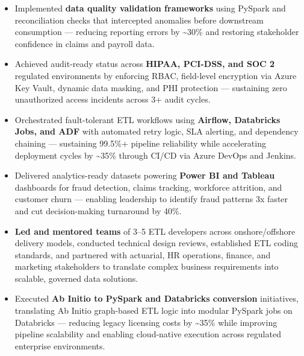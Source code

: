 \documentclass[a4paper,10pt]{article}
\begin{document}
\begin{itemize}
    \item Implemented \textbf{data quality validation frameworks} using PySpark and reconciliation checks that intercepted anomalies before downstream consumption — reducing reporting errors by \textasciitilde 30\% and restoring stakeholder confidence in claims and payroll data.
    \item Achieved audit-ready status across \textbf{HIPAA, PCI-DSS, and SOC 2} regulated environments by enforcing RBAC, field-level encryption via Azure Key Vault, dynamic data masking, and PHI protection — sustaining zero unauthorized access incidents across 3+ audit cycles.
    \item Orchestrated fault-tolerant ETL workflows using \textbf{Airflow, Databricks Jobs, and ADF} with automated retry logic, SLA alerting, and dependency chaining — sustaining 99.5\%+ pipeline reliability while accelerating deployment cycles by \textasciitilde 35\% through CI/CD via Azure DevOps and Jenkins.
    \item Delivered analytics-ready datasets powering \textbf{Power BI and Tableau} dashboards for fraud detection, claims tracking, workforce attrition, and customer churn — enabling leadership to identify fraud patterns 3x faster and cut decision-making turnaround by 40\%.
    \item \textbf{Led and mentored teams} of 3--5 ETL developers across onshore/offshore delivery models, conducted technical design reviews, established ETL coding standards, and partnered with actuarial, HR operations, finance, and marketing stakeholders to translate complex business requirements into scalable, governed data solutions.
    \item Executed \textbf{Ab Initio to PySpark and Databricks conversion} initiatives, translating Ab Initio graph-based ETL logic into modular PySpark jobs on Databricks — reducing legacy licensing costs by \textasciitilde 35\% while improving pipeline scalability and enabling cloud-native execution across regulated enterprise environments.
\end{itemize}
\end{document}
